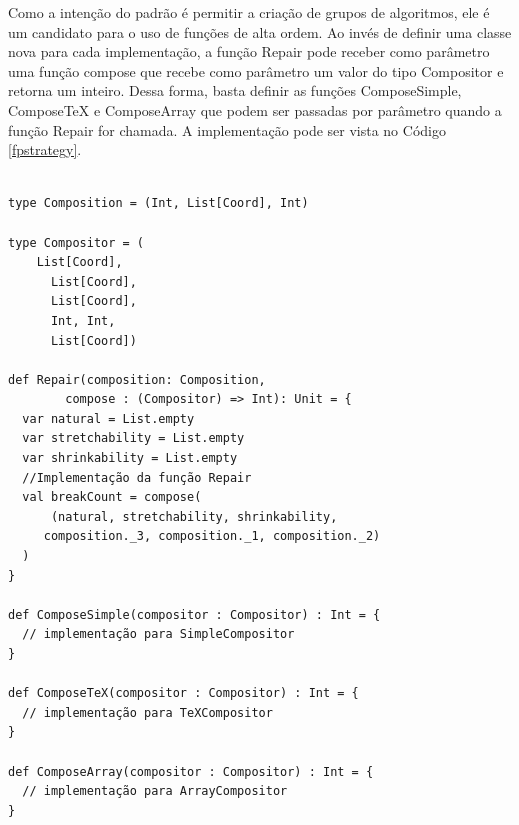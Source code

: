 Como a intenção do padrão é permitir a criação de 
grupos de algoritmos, ele é um candidato para o uso 
de funções de alta ordem. Ao invés de definir 
uma classe nova para cada implementação, a 
função Repair pode receber como parâmetro uma 
função compose que recebe como parâmetro um valor 
do tipo Compositor e retorna 
um inteiro. Dessa forma, basta definir as 
funções ComposeSimple, ComposeTeX e ComposeArray 
que podem ser passadas por parâmetro quando a 
função Repair for chamada. A implementação pode 
ser vista no Código \ref{fpstrategy}.

\begin{lstlisting}[caption={Strategy Funcional.},label=fpstrategy]
    
type Composition = (Int, List[Coord], Int)

type Compositor = (
    List[Coord],
      List[Coord],
      List[Coord],
      Int, Int,
      List[Coord])

def Repair(composition: Composition,
        compose : (Compositor) => Int): Unit = {
  var natural = List.empty
  var stretchability = List.empty
  var shrinkability = List.empty
  //Implementação da função Repair
  val breakCount = compose(
      (natural, stretchability, shrinkability,
     composition._3, composition._1, composition._2)
  )
}

def ComposeSimple(compositor : Compositor) : Int = {
  // implementação para SimpleCompositor
}

def ComposeTeX(compositor : Compositor) : Int = {
  // implementação para TeXCompositor
}

def ComposeArray(compositor : Compositor) : Int = {
  // implementação para ArrayCompositor
}
    
\end{lstlisting}

